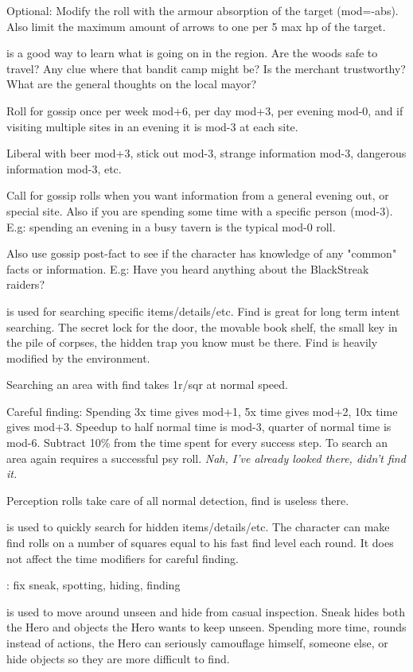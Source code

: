 Optional: Modify the roll with the armour absorption of the target (mod=-abs). Also limit the maximum amount of arrows to one per 5 max hp of the target.


 is a good way to learn what is going on in the region. Are the woods safe to travel? Any clue where that bandit camp might be? Is the merchant trustworthy? What are the general thoughts on the local mayor?

Roll for gossip once per week mod+6, per day mod+3, per evening mod-0, and if visiting multiple sites in an evening it is mod-3 at each site.

Liberal with beer mod+3, stick out mod-3, strange information mod-3, dangerous information mod-3, etc.

Call for gossip rolls when you want information from a general evening out, or special site. Also if you are spending some time with a specific person (mod-3). E.g: spending an evening in a busy tavern is the typical mod-0 roll.

Also use gossip post-fact to see if the character has knowledge of any "common" facts or information. E.g: Have you heard anything about the BlackStreak raiders?


 is used for searching specific items/details/etc. Find is great for long term intent searching. The secret lock for the door, the movable book shelf, the small key in the pile of corpses, the hidden trap you know must be there. Find is heavily modified by the environment.

Searching an area with find takes 1r/sqr at normal speed.

Careful finding: Spending 3x time gives mod+1, 5x time gives mod+2, 10x time gives mod+3. Speedup to half normal time is mod-3, quarter of normal time is mod-6. Subtract 10\% from the time spent for every success step. To search an area again requires a successful psy roll. \emph{Nah, I've already looked there, didn't find it.}

Perception rolls take care of all normal detection, find is useless there.


 is used to quickly search for hidden items/details/etc. The character can make find rolls on a number of squares equal to his fast find level each round. It does not affect the time modifiers for careful finding.


\TODO: fix sneak, spotting, hiding, finding

 is used to move around unseen and hide from casual inspection. Sneak hides both the Hero and objects the Hero wants to keep unseen. Spending more time, rounds instead of actions, the Hero can seriously camouflage himself, someone else, or hide objects so they are more difficult to find.

